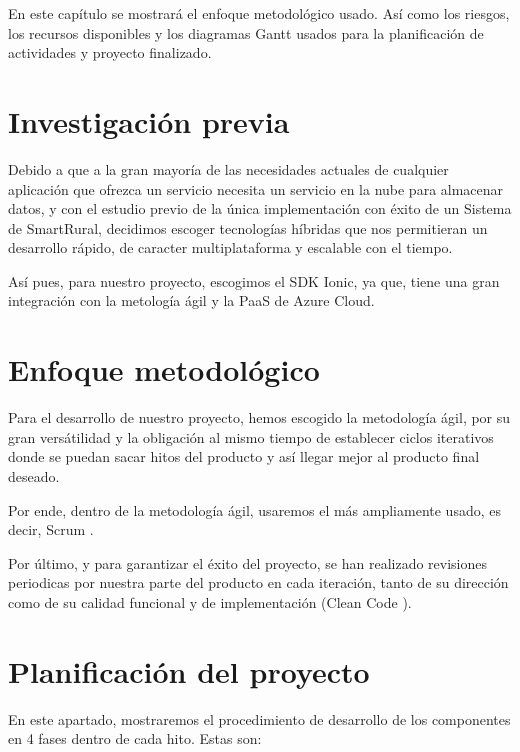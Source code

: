 En este capítulo se mostrará el enfoque metodológico usado. Así como los riesgos, los recursos disponibles y los diagramas Gantt usados para la planificación de actividades y proyecto finalizado.

\newpage

\section{Investigación previa}
Debido a que a la gran mayoría de las necesidades actuales de cualquier aplicación que ofrezca un servicio necesita un servicio en la nube para almacenar datos, y con el estudio previo de la única implementación con éxito de un Sistema de SmartRural, decidimos escoger tecnologías híbridas que nos permitieran un desarrollo rápido, de caracter multiplataforma y escalable con el tiempo.

Así pues, para nuestro proyecto, escogimos el SDK Ionic, ya que, tiene una gran integración con la metología ágil y la PaaS de Azure Cloud.

\section{Enfoque metodológico}
Para el desarrollo de nuestro proyecto, hemos escogido la metodología ágil, por su gran versátilidad y la obligación al mismo tiempo de establecer ciclos iterativos donde se puedan sacar hitos del producto y así llegar mejor al producto final deseado.

Por ende, dentro de la metodología ágil, usaremos el más ampliamente usado, es decir, Scrum \cite{scrum}.

Por último, y para garantizar el éxito del proyecto, se han realizado revisiones periodicas por nuestra parte del producto en cada iteración, tanto de su dirección como de su calidad funcional y de implementación (Clean Code \cite{cleancode}\cite{cleancodebook}).

\section{Planificación del proyecto}
En este apartado, mostraremos el procedimiento de desarrollo de los componentes en 4 fases dentro de cada hito. Estas son:

